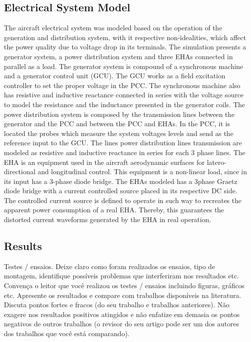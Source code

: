\subsection{Electrical System Model}

The aircraft electrical system was modeled based on the operation of the generation and distribution system, with it respective non-idealities, which affect the power quality due to voltage drop in its terminals. The simulation presents a generator system, a power distribution system and three EHAs connected in parallel as a load.
The generator system is compound of a synchronous machine and a generator control unit (GCU). The GCU works as a field excitation controller to set the proper voltage in the PCC. The synchronous machine also has resistive and inductive reactance connected in series with the voltage source to model the resistance and the inductance presented in the generator coils.
The power distribution system is composed by the transmission lines between the generator and the PCC and between the PCC and EHAs. In the PCC, it is located the probes which measure the system voltages levels and send as the reference input to the GCU. The lines power distribution lines transmission are modeled as resistive and inductive reactance in series for each 3 phase lines.
The EHA is an equipment used in the aircraft aerodynamic surfaces for latero-directional and longitudinal control. This equipment is a non-linear load, since in its input has a 3-phase diode bridge. The EHAs modeled has a 3phase Graetz diode bridge with a current controlled source placed in its respective DC side. The controlled current source is defined to operate in such way to recreates the apparent power consumption of a real EHA. Thereby, this guarantees the distorted current waveforms generated by the EHA in real operation.

\subsection{Results}


Testes / ensaios. Deixe claro como foram realizados os ensaios, tipo de montagem, identifique possíveis problemas que interferiram nos resultados etc. 
Convença o leitor que você realizou os testes / ensaios  incluindo figuras, gráficos etc.  
Apresente os resultados e compare com trabalhos disponíveis na literatura. Discuta pontos fortes e fracos (do seu trabalho e trabalhos anteriores). Não exagere nos resultados positivos atingidos e não enfatize em demasia os pontos  negativos de outros trabalhos (o revisor do seu artigo pode ser um dos autores dos trabalhos que você está comparando).
